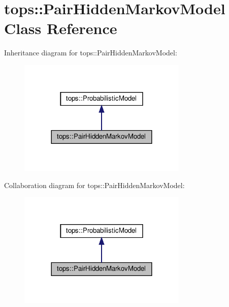 \hypertarget{classtops_1_1PairHiddenMarkovModel}{}\section{tops\+:\+:Pair\+Hidden\+Markov\+Model Class Reference}
\label{classtops_1_1PairHiddenMarkovModel}


Inheritance diagram for tops\+:\+:Pair\+Hidden\+Markov\+Model\+:
\nopagebreak
\begin{figure}[H]
\begin{center}
\leavevmode
\includegraphics[width=228pt]{classtops_1_1PairHiddenMarkovModel__inherit__graph}
\end{center}
\end{figure}


Collaboration diagram for tops\+:\+:Pair\+Hidden\+Markov\+Model\+:
\nopagebreak
\begin{figure}[H]
\begin{center}
\leavevmode
\includegraphics[width=228pt]{classtops_1_1PairHiddenMarkovModel__coll__graph}
\end{center}
\end{figure}
